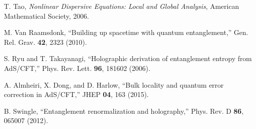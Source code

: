 \documentclass[12pt]{article}
\begin{document}
\begin{thebibliography}{99}

 T. Tao, \emph{Nonlinear Dispersive Equations: Local and Global Analysis}, American Mathematical Society, 2006.

 M. Van Raamsdonk, ``Building up spacetime with quantum entanglement,'' Gen. Rel. Grav. \textbf{42}, 2323 (2010).

 S. Ryu and T. Takayanagi, ``Holographic derivation of entanglement entropy from AdS/CFT,'' Phys. Rev. Lett. \textbf{96}, 181602 (2006).

 A. Almheiri, X. Dong, and D. Harlow, ``Bulk locality and quantum error correction in AdS/CFT,'' JHEP \textbf{04}, 163 (2015).

 B. Swingle, ``Entanglement renormalization and holography,'' Phys. Rev. D \textbf{86}, 065007 (2012).

\end{thebibliography}
\end{document}
